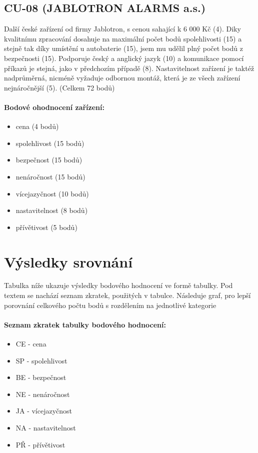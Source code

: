 \documentclass[FM,MP]{tulthesis}  %
\begin{document}
\subsection{CU-08 (JABLOTRON ALARMS a.s.)}
Další české zařízení od firmy Jablotron, s cenou sahající k 6 000 Kč (4). Diky kvalitnímu zpracování dosahuje na maximální počet bodů spolehlivosti (15) a stejně tak díky umístění u autobaterie (15), jsem mu udělil plný počet bodů z bezpečnosti (15). Podporuje český a anglický jazyk (10) a komunikace pomocí příkazů je stejná, jako v předchozím případě (8). Nastavitelnost zařízení je taktéž nadprůměrná, nicméně vyžaduje odbornou montáž, která je ze všech zařízení nejnáročnější (5). (Celkem 72 bodů)

\paragraph{Bodové ohodnocení zařízení:}
\begin{itemize}
\item cena (4 bodů)
\item spolehlivost (15 bodů)
\item bezpečnost (15 bodů)
\item nenáročnost (15 bodů)
\item vícejazyčnost (10 bodů)
\item nastavitelnost (8 bodů)
\item přívětivost (5 bodů)
\end{itemize}


\section{Výsledky srovnání}
Tabulka níže ukazuje výsledky bodového hodnocení ve formě tabulky. Pod textem se nachází seznam zkratek, použitých v tabulce. Následuje graf, pro lepší  porovnání celkového počtu bodů s rozdělením na jednotlivé kategorie

\paragraph{Seznam zkratek tabulky bodového hodnocení:}
\begin{itemize}
\item CE - cena
\item SP - spolehlivost
\item BE - bezpečnost
\item NE - nenáročnost
\item JA - vícejazyčnost
\item NA - nastavitelnost
\item PŘ - přívětivost
\end{itemize}
\end{document}
